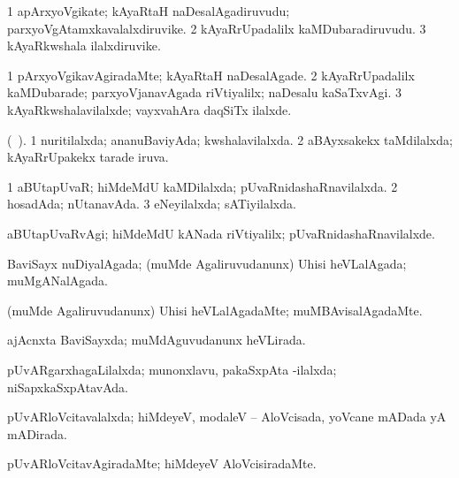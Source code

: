 \bentry
{} 
\gl{\nA}
\expl{}
\bmng
\bnum
\num{1} apArxyoVgikate; kAyaRtaH naDesalAgadiruvudu; parxyoVgAtamxkavalalxdiruvike. 
\num{2} kAyaRrUpadalilx kaMDubaradiruvudu. 
\num{3} kAyaRkwshala ilalxdiruvike. 
\enum
\emng
\eentry

\bentry
{} 
\gl{\kirxvi}
\expl{}
\bmng
\bnum
\num{1} pArxyoVgikavAgiradaMte; kAyaRtaH naDesalAgade. 
\num{2} kAyaRrUpadalilx kaMDubarade; parxyoVjanavAgada riVtiyalilx; naDesalu kaSaTxvAgi. 
\num{3} kAyaRkwshalavilalxde; vayxvahAra daqSiTx ilalxde. 
\enum
\emng
\eentry

\bentry
{} 
\gl{\gu}
\expl{}
(\ame\ ). \bmng
\bnum
\num{1} nuritilalxda; ananuBaviyAda; kwshalavilalxda. 
\num{2} aBAyxsakekx taMdilalxda; kAyaRrUpakekx tarade iruva. 
\enum
\emng
\eentry

\bentry
{} 
\gl{\gu}
\expl{}
\bmng
\bnum
\num{1} aBUtapUvaR; hiMdeMdU kaMDilalxda; pUvaRnidashaRnavilalxda. 
\num{2} hosadAda; nUtanavAda. 
\num{3} eNeyilalxda; sATiyilalxda. 
\enum
\emng
\eentry

\bentry
{} 
\gl{\kirxvi}
\expl{}
\bmng
aBUtapUvaRvAgi; hiMdeMdU kANada riVtiyalilx; pUvaRnidashaRnavilalxde. 
\emng
\eentry

\bentry
{} 
\gl{\gu}
\expl{}
\bmng
BaviSayx nuDiyalAgada; (muMde Agaliruvudanunx) Uhisi heVLalAgada; muMgANalAgada. 
\emng
\eentry

\bentry
{} 
\gl{\kirxvi}
\expl{}
\bmng
(muMde Agaliruvudanunx) Uhisi heVLalAgadaMte; muMBAvisalAgadaMte. 
\emng
\eentry

\bentry
{} 
\gl{\gu}
\expl{}
\bmng
ajAcnxta BaviSayxda; muMdAguvudanunx heVLirada. 
\emng
\eentry

\bentry
{} 
\gl{\gu}
\expl{}
\bmng
pUvARgarxhagaLilalxda; munonxlavu, pakaSxpAta -ilalxda; niSapxkaSxpAtavAda. 
\emng
\eentry

\bentry
{} 
\gl{\gu}
\expl{}
\bmng
pUvARloVcitavalalxda; hiMdeyeV, modaleV -- AloVcisada, yoVcane mADada yA mADirada. 
\emng
\eentry

\bentry
{} 
\gl{\kirxvi}
\expl{}
\bmng
pUvARloVcitavAgiradaMte; hiMdeyeV AloVcisiradaMte. 
\emng
\eentry

